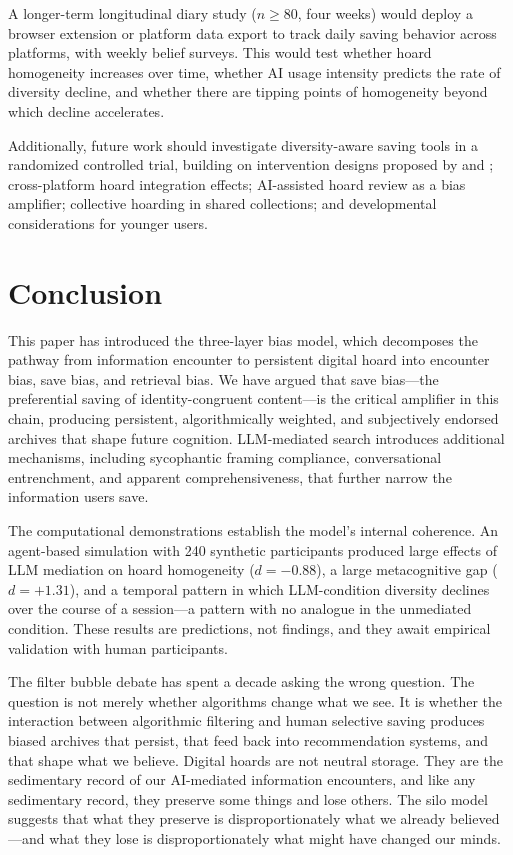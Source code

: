 \documentclass[12pt,a4paper]{article}
\begin{document}
A longer-term longitudinal diary study ($n \geq 80$, four weeks) would deploy a browser extension or platform data export to track daily saving behavior across platforms, with weekly belief surveys.
This would test whether hoard homogeneity increases over time, whether AI usage intensity predicts the rate of diversity decline, and whether there are tipping points of homogeneity beyond which decline accelerates.

Additionally, future work should investigate diversity-aware saving tools in a randomized controlled trial, building on intervention designs proposed by \citet{Jiang2025} and \citet{Yu2024}; cross-platform hoard integration effects; AI-assisted hoard review as a bias amplifier; collective hoarding in shared collections; and developmental considerations for younger users.


\section{Conclusion}

This paper has introduced the three-layer bias model, which decomposes the pathway from information encounter to persistent digital hoard into encounter bias, save bias, and retrieval bias.
We have argued that save bias---the preferential saving of identity-congruent content---is the critical amplifier in this chain, producing persistent, algorithmically weighted, and subjectively endorsed archives that shape future cognition.
LLM-mediated search introduces additional mechanisms, including sycophantic framing compliance, conversational entrenchment, and apparent comprehensiveness, that further narrow the information users save.

The computational demonstrations establish the model's internal coherence.
An agent-based simulation with 240 synthetic participants produced large effects of LLM mediation on hoard homogeneity ($d = -0.88$), a large metacognitive gap ($d = +1.31$), and a temporal pattern in which LLM-condition diversity declines over the course of a session---a pattern with no analogue in the unmediated condition.
These results are predictions, not findings, and they await empirical validation with human participants.

The filter bubble debate has spent a decade asking the wrong question.
The question is not merely whether algorithms change what we see.
It is whether the interaction between algorithmic filtering and human selective saving produces biased archives that persist, that feed back into recommendation systems, and that shape what we believe.
Digital hoards are not neutral storage.
They are the sedimentary record of our AI-mediated information encounters, and like any sedimentary record, they preserve some things and lose others.
The silo model suggests that what they preserve is disproportionately what we already believed---and what they lose is disproportionately what might have changed our minds.
\end{document}
